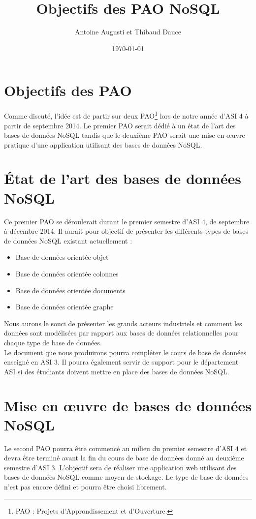 \documentclass[a4paper, 12pt, french]{article}
\title{Objectifs des PAO NoSQL}
\author{Antoine Augusti et Thibaud Dauce}
\date{\today}
\begin{document}
	\maketitle

	\section{Objectifs des PAO}
		Comme discuté, l'idée est de partir sur deux PAO\footnote{PAO : Projets d'Approndissement et d'Ouverture.} lors de notre année d'ASI 4 à partir de septembre 2014. Le premier PAO serait dédié à un état de l'art des bases de données NoSQL tandis que le deuxième PAO serait une mise en œuvre pratique d'une application utilisant des bases de données NoSQL.

		\section{État de l'art des bases de données NoSQL}
		Ce premier PAO se déroulerait durant le premier semestre d'ASI 4, de septembre à décembre 2014. Il aurait pour objectif de présenter les différents types de bases de données NoSQL existant actuellement :
		\vspace{10px}
		\begin{itemize}
			\item Base de données orientée objet
			\item Base de données orientée colonnes
			\item Base de données orientée documents
			\item Base de données orientée graphe
		\end{itemize}
		\vspace{10px}

		Nous aurons le souci de présenter les grands acteurs industriels et comment les données sont modélisées par rapport aux bases de données relationnelles pour chaque type de base de données.\\

		Le document que nous produirons pourra compléter le cours de base de données enseigné en ASI 3. Il pourra également servir de support pour le département ASI si des étudiants doivent mettre en place des bases de données NoSQL.
	
	\section{Mise en œuvre de bases de données NoSQL}
		Le second PAO pourra être commencé au milieu du premier semestre d'ASI 4 et devra être terminé avant la fin du cours de base de données donné au deuxième semestre d'ASI 3. L'objectif sera de réaliser une application web utilisant des bases de données NoSQL comme moyen de stockage. Le type de base de données n'est pas encore défini et pourra être choisi librement.\\
\end{document}
